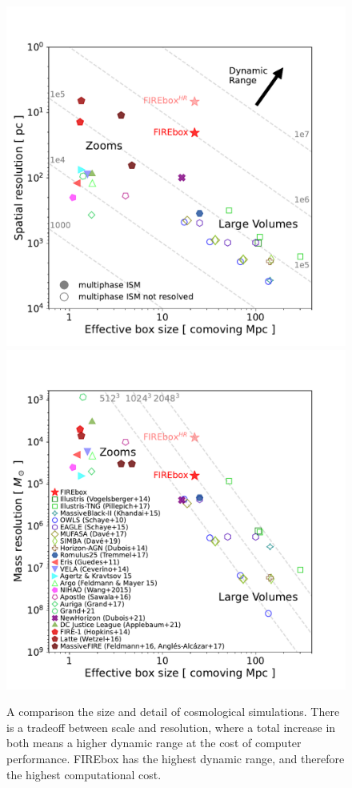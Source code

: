 \begin{figure}
    \includegraphics[width=\textwidth/2]{figs/feldmann/fig2a}
    \includegraphics[width=\textwidth/2]{figs/feldmann/fig2b}
    
    \caption{A comparison the size and detail of cosmological simulations. There is a tradeoff between scale and resolution, where a total increase in both means a higher dynamic range at the cost of computer performance. FIREbox has the highest dynamic range, and therefore the highest computational cost.}

    \label{fig:feldmann-dynrange}
\end{figure}

